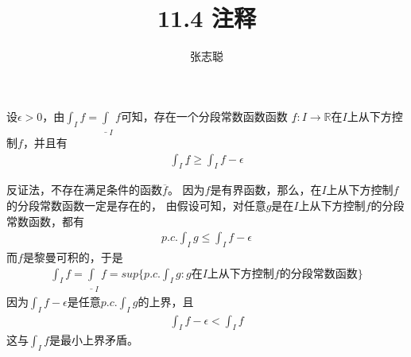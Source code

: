 \documentclass{article}
\begin{document}
\title{11.4 注释}
\author{张志聪}
\maketitle

\begin{zremark}
  设$\epsilon > 0$，由$\int_I f = \underline{\int}_I f$可知，存在一个分段常数函数函数
  $\underline{f} : I \to \mathbb{R}$在$I$上从下方控制$f$，并且有
  \begin{align*}
    \int_I \underline{f} \geq \int_I f - \epsilon
  \end{align*}
\end{zremark}

反证法，不存在满足条件的函数$\overline{f}$。
因为$f$是有界函数，那么，在$I$上从下方控制$f$的分段常数函数一定是存在的，
由假设可知，对任意$g$是在$I$上从下方控制$f$的分段常数函数，都有
\begin{align*}
  p.c.\int_I g \leq \int_I f - \epsilon 
\end{align*}
而$f$是黎曼可积的，于是
\begin{align*}
  \int_I f = \underline{\int}_I f = sup\{p.c.\int_I g: g \text{在} I \text{上从下方控制}f \text{的分段常数函数}\}
\end{align*}
因为$\int_I f - \epsilon $是任意$p.c.\int_I g$的上界，且
\begin{align*}
  \int_I f - \epsilon < \int_I f 
\end{align*}
这与$\int_I f$是最小上界矛盾。
\end{document}

